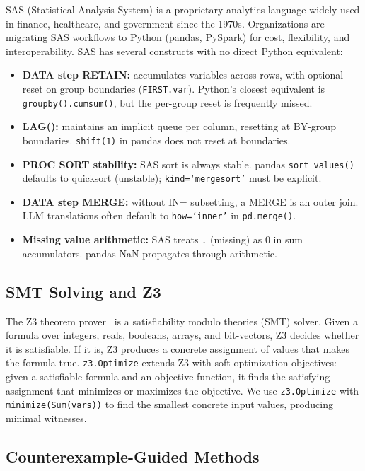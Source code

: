 \documentclass[conference]{IEEEtran}
\begin{document}
SAS (Statistical Analysis System) is a proprietary analytics language widely used in
finance, healthcare, and government since the 1970s. Organizations are migrating SAS
workflows to Python (pandas, PySpark) for cost, flexibility, and interoperability.
SAS has several constructs with no direct Python equivalent:

\begin{itemize}
  \item \textbf{DATA step RETAIN:} accumulates variables across rows, with optional
        reset on group boundaries (\texttt{FIRST.var}). Python's closest equivalent is
        \texttt{groupby().cumsum()}, but the per-group reset is frequently missed.
  \item \textbf{LAG():} maintains an implicit queue per column, resetting at BY-group
        boundaries. \texttt{shift(1)} in pandas does not reset at boundaries.
  \item \textbf{PROC SORT stability:} SAS sort is always stable. pandas
        \texttt{sort\_values()} defaults to quicksort (unstable); \texttt{kind=`mergesort'}
        must be explicit.
  \item \textbf{DATA step MERGE:} without IN= subsetting, a MERGE is an outer join.
        LLM translations often default to \texttt{how=`inner'} in \texttt{pd.merge()}.
  \item \textbf{Missing value arithmetic:} SAS treats \texttt{.} (missing) as 0 in
        sum accumulators. pandas NaN propagates through arithmetic.
\end{itemize}

\subsection{SMT Solving and Z3}

The Z3 theorem prover~\cite{z3} is a satisfiability modulo theories (SMT) solver.
Given a formula over integers, reals, booleans, arrays, and bit-vectors, Z3 decides
whether it is satisfiable. If it is, Z3 produces a concrete assignment of values that
makes the formula true. \texttt{z3.Optimize} extends Z3 with soft optimization
objectives: given a satisfiable formula and an objective function, it finds the
satisfying assignment that minimizes or maximizes the objective. We use
\texttt{z3.Optimize} with \texttt{minimize(Sum(vars))} to find the smallest concrete
input values, producing minimal witnesses.

\subsection{Counterexample-Guided Methods}
\end{document}
